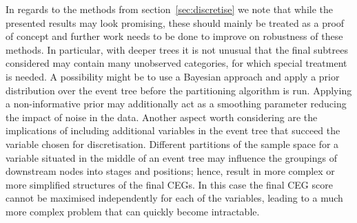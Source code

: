 \documentclass[runningheads]{llncs}
\begin{document}
In regards to the methods from section~\ref{sec:discretise} we note that while the presented results may look promising, these should mainly be treated as a proof of concept and further work needs to be done to improve on robustness of these methods. In particular, with deeper trees it is not unusual that the final subtrees considered may contain many unobserved categories, for which special treatment is needed. A possibility might be to use a Bayesian approach and apply a prior distribution over the event tree before the partitioning algorithm is run. Applying a non-informative prior may additionally act as a smoothing parameter reducing the impact of noise in the data. Another aspect worth considering are the implications of including additional variables in the event tree that succeed the variable chosen for discretisation. Different partitions of the sample space for a variable situated in the middle of an event tree may influence the groupings of downstream nodes into stages and positions; hence, result in more complex or more simplified structures of the final CEGs. In this case the final CEG score cannot be maximised independently for each of the variables, leading to a much more complex problem that can quickly become intractable. 







%
\newpage


%
\end{document}
